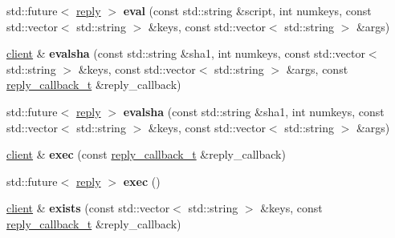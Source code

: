 \begin{DoxyCompactItemize}
\item 
\mbox{\label{classcpp__redis_1_1client_a01b328b664e5cf604150e3d0f881ff4c}} 
std\+::future$<$ \hyperlink{classcpp__redis_1_1reply}{reply} $>$ {\bfseries eval} (const std\+::string \&script, int numkeys, const std\+::vector$<$ std\+::string $>$ \&keys, const std\+::vector$<$ std\+::string $>$ \&args)
\item 
\mbox{\label{classcpp__redis_1_1client_a71cd73130b4755c9f4da3b602b09a1be}} 
\hyperlink{classcpp__redis_1_1client}{client} \& {\bfseries evalsha} (const std\+::string \&sha1, int numkeys, const std\+::vector$<$ std\+::string $>$ \&keys, const std\+::vector$<$ std\+::string $>$ \&args, const \hyperlink{classcpp__redis_1_1client_a061a1140d36d2eaeda82b09a0bb3f9f2}{reply\+\_\+callback\+\_\+t} \&reply\+\_\+callback)
\item 
\mbox{\label{classcpp__redis_1_1client_a3ab7684f292037dc3918c32549b7ad53}} 
std\+::future$<$ \hyperlink{classcpp__redis_1_1reply}{reply} $>$ {\bfseries evalsha} (const std\+::string \&sha1, int numkeys, const std\+::vector$<$ std\+::string $>$ \&keys, const std\+::vector$<$ std\+::string $>$ \&args)
\item 
\mbox{\label{classcpp__redis_1_1client_a76e78829c4ee2e1484268e465fab8997}} 
\hyperlink{classcpp__redis_1_1client}{client} \& {\bfseries exec} (const \hyperlink{classcpp__redis_1_1client_a061a1140d36d2eaeda82b09a0bb3f9f2}{reply\+\_\+callback\+\_\+t} \&reply\+\_\+callback)
\item 
\mbox{\label{classcpp__redis_1_1client_a93c5b232ae13b5107b6aa1ea5f70b70d}} 
std\+::future$<$ \hyperlink{classcpp__redis_1_1reply}{reply} $>$ {\bfseries exec} ()
\item 
\mbox{\label{classcpp__redis_1_1client_a11836c341d54a9d767cd37508bf87d73}} 
\hyperlink{classcpp__redis_1_1client}{client} \& {\bfseries exists} (const std\+::vector$<$ std\+::string $>$ \&keys, const \hyperlink{classcpp__redis_1_1client_a061a1140d36d2eaeda82b09a0bb3f9f2}{reply\+\_\+callback\+\_\+t} \&reply\+\_\+callback)
\item 
\mbox{\label{classcpp__redis_1_1client_a16ab72e15bd14a3fd2eb97194cea3d2d}} 

\end{DoxyCompactItemize}
